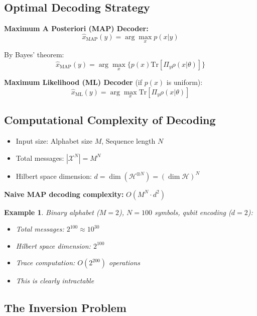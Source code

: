 \documentclass[12pt,a4paper]{article}
\newtheorem{example}{Example}[section]
\begin{document}
\subsection{Optimal Decoding Strategy}

\textbf{Maximum A Posteriori (MAP) Decoder:}
\begin{equation}
\hat{x}_{\text{MAP}}(y) = \arg\max_x p(x|y)
\end{equation}

By Bayes' theorem:
\begin{equation}
\hat{x}_{\text{MAP}}(y) = \arg\max_x \{p(x)\text{Tr}[\Pi_y\rho(x|\theta)]\}
\end{equation}

\textbf{Maximum Likelihood (ML) Decoder} (if $p(x)$ is uniform):
\begin{equation}
\hat{x}_{\text{ML}}(y) = \arg\max_x \text{Tr}[\Pi_y\rho(x|\theta)]
\end{equation}

\subsection{Computational Complexity of Decoding}

\begin{itemize}
\item Input size: Alphabet size $M$, Sequence length $N$
\item Total messages: $|\mathcal{X}^N| = M^N$
\item Hilbert space dimension: $d = \dim(\mathcal{H}^{\otimes N}) = (\dim\mathcal{H})^N$
\end{itemize}

\textbf{Naive MAP decoding complexity:} $O(M^N \cdot d^2)$

\begin{example}
Binary alphabet ($M = 2$), $N = 100$ symbols, qubit encoding ($d = 2$):
\begin{itemize}
\item Total messages: $2^{100} \approx 10^{30}$
\item Hilbert space dimension: $2^{100}$
\item Trace computation: $O(2^{200})$ operations
\item This is clearly intractable
\end{itemize}
\end{example}

\subsection{The Inversion Problem}
\end{document}
